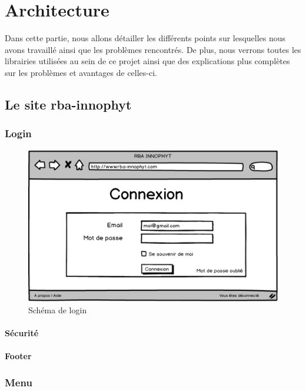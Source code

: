 \documentclass[twoside]{EPURapport}
\begin{document}
\chapter{Architecture}

Dans cette partie, nous allons détailler les différents points sur lesquelles nous avons travaillé ainsi que les problèmes rencontrés. De plus, nous verrons toutes les librairies utilisées au sein de ce projet ainsi que des explications plus complètes sur les problèmes et avantages de celles-ci.

	\section{Le site rba-innophyt}
	
		\subsection{Login}
		
\begin{figure}[hbtp]
			\centering
			\includegraphics[scale=0.5]{images/login.png}
			\caption{Schéma de login}
		\end{figure}			
		
		
			\subsubsection{Sécurité}
			\subsubsection{Footer}
		\subsection{Menu}
		
\end{document}
